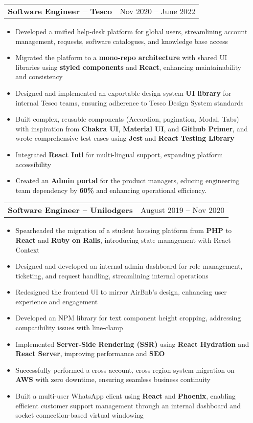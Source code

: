 \documentclass[letterpaper,11pt]{article}
\makeatletter
\newcommand{\resumeItem}[1]{
  \item\small{
    {#1 \vspace{-2pt}}
  }
}
\newcommand{\resumeSubheadingHeading}[2]{
  \vspace{-2pt}\item
    \begin{tabular*}{0.97\textwidth}{l@{\extracolsep{\fill}}r}
      \textbf{#1} & #2 \\
    \end{tabular*}\vspace{-7pt}
}
\newcommand{\resumeItemListStart}{\begin{itemize}}
\newcommand{\resumeItemListEnd}{\end{itemize}\vspace{-5pt}}
\makeatother
\begin{document}
    \resumeSubheadingHeading
      {Software Engineer -- Tesco}{Nov 2020 -- June 2022}
      \resumeItemListStart
        \resumeItem{Developed a unified help-desk platform for global users, streamlining account management, requests, software catalogues, and knowledge base access}
        \resumeItem{Migrated the platform to a \textbf{mono-repo architecture} with shared UI libraries using \textbf{styled components} and \textbf{React}, enhancing maintainability and consistency}
        \resumeItem{Designed and implemented an exportable design system \textbf{UI library} for internal Tesco teams, ensuring adherence to Tesco Design System standards}
        \resumeItem{Built complex, reusable components (Accordion, pagination, Modal, Tabs) with inspiration from \textbf{Chakra UI}, \textbf{Material UI}, and \textbf{Github Primer}, and wrote comprehensive test cases using \textbf{Jest} and \textbf{React Testing Library}}
        \resumeItem{Integrated \textbf{React Intl} for multi-lingual support, expanding platform accessibility}
        \resumeItem{Created an \textbf{Admin portal} for the product managers, educing engineering team dependency by \textbf{60\%} and enhancing operational efficiency.}
      \resumeItemListEnd

    \resumeSubheadingHeading
      {Software Engineer -- Unilodgers}{August 2019 -- Nov 2020}
      \resumeItemListStart
        \resumeItem{Spearheaded the migration of a student housing platform from \textbf{PHP} to \textbf{React} and \textbf{Ruby on Rails}, introducing state management with React Context}
        \resumeItem{Designed and developed an internal admin dashboard for role management, ticketing, and request handling, streamlining internal operations}
        \resumeItem{Redesigned the frontend UI to mirror AirBnb's design, enhancing user experience and engagement}
        \resumeItem{Developed an NPM library for text component height cropping, addressing compatibility issues with line-clamp}
        \resumeItem{Implemented \textbf{Server-Side Rendering (SSR)} using \textbf{React Hydration} and \textbf{React Server}, improving performance and \textbf{SEO}}
        \resumeItem{Successfully performed a cross-account, cross-region system migration on \textbf{AWS} with zero downtime, ensuring seamless business continuity}
        \resumeItem{Built a multi-user WhatsApp client using \textbf{React} and \textbf{Phoenix}, enabling efficient customer support management through an internal dashboard and socket connection-based virtual windowing}
      \resumeItemListEnd
\end{document}
